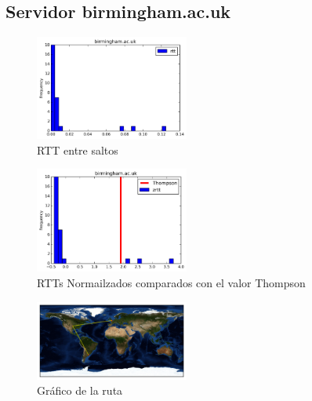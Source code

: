 \subsection{Servidor birmingham.ac.uk}
\begin{figure}[H]
  \centering
    \includegraphics[width=0.45\textwidth]{histogramas_rtt/birmingham-ac-uk.png}
  \caption{RTT entre saltos}
  \label{entropia-s}
\end{figure}

\begin{figure}[H]
  \centering
    \includegraphics[width=0.45\textwidth]{histogramas_thompson/birmingham-ac-uk.png}
  \caption{RTTs Normailzados comparados con el valor Thompson}
  \label{entropia-s}
\end{figure}

\begin{figure}[H]
  \centering
    \includegraphics[width=0.45\textwidth]{grafico-rutas/birmingham-ac-uk.png}
  \caption{Gráfico de la ruta}
  \label{entropia-s}
\end{figure}